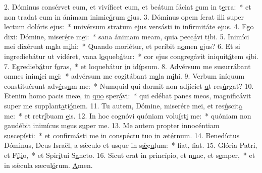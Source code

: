 2. Dóminus consérvet eum, et vivíficet eum, et beátum fáciat \uline{e}um in t\uline{e}rra:~* et non tradat eum in ánimam inimic\uline{ó}rum \uline{e}jus.
3. Dóminus opem ferat illi super lectum dol\uline{ó}ris \uline{e}jus:~* univérsum stratum ejus versásti in infirmit\uline{á}te \uline{e}jus.
4. Ego dixi: Dómine, miser\uline{é}re m\uline{e}i:~* sana ánimam meam, quia pecc\uline{á}vi t\uline{i}bi.
5. Inimíci mei dixérunt m\uline{a}la m\uline{i}hi:~* Quando moriétur, et períbit n\uline{o}men \uline{e}jus?
6. Et si ingrediebátur ut vidéret, vana l\uline{o}queb\uline{á}tur:~* cor ejus congregávit iniquit\uline{á}tem s\uline{i}bi.
7. Egredieb\uline{á}tur f\uline{o}ras,~* et loquebátur \uline{i}n id\uline{í}psum.
8. Advérsum me susurrábant omnes inim\uline{í}ci m\uline{e}i:~* advérsum me cogitábant m\uline{a}la m\uline{i}hi.
9. Verbum iníquum constituérunt adv\uline{é}rs\uline{u}m me:~* Numquid qui dormit non adjíciet \uline{u}t res\uline{ú}rgat?
10. Etenim homo pacis meæ, in \uline{quo} sper\uline{á}vi:~* qui edébat panes meos, magnificávit super me supplant\uline{a}ti\uline{ó}nem.
11. Tu autem, Dómine, miserére mei, et res\uline{ú}scit\uline{a} me:~* et retr\uline{í}buam \uline{e}is.
12. In hoc cognóvi quóniam volu\uline{í}st\uline{i} me:~* quóniam non gaudébit inimícus m\uline{e}us s\uline{u}per me.
13. Me autem propter innocéntiam s\uline{u}scep\uline{í}sti:~* et confirmásti me in conspéctu tuo \uline{i}n æt\uline{é}rnum.
14. Benedíctus Dóminus, Deus Israël, a sǽculo et usque in s\uline{ǽ}c\uline{u}lum:~* f\uline{i}at, f\uline{i}at.
15. Glória Patri, et F\uline{í}l\uline{i}o,~* et Spir\uline{í}tui S\uline{a}ncto.
16. Sicut erat in princípio, et n\uline{u}nc, et s\uline{e}mper,~* et in sǽcula sæcul\uline{ó}rum. \uline{A}men.
